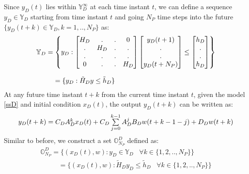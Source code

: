 \documentclass[letterpaper, 10 pt, conference]{ieeeconf}  %
\begin{document}
 Since $y_D(t)$ lies within $\mathbb{Y}_D^{\infty}$ at each time instant $t$, we can define a sequence $y_D \in \mathbb{Y}_D$ starting from time instant $t$ and going $N_P$ time steps into the future $\{y_D(t+k)\in\mathbb{Y}_D,k=1,..,N_P\}$ as:
 \begin{equation}
 \small
 \begin{matrix}
 \mathbb{Y}_D=\begin{Bmatrix}y_D:
 \begin{bmatrix}
 H_D & . & . & 0 \\
 . & H_D & . & .\\
 . & . & . & . \\
 0 & . & . & H_D
 \end{bmatrix}
 \begin{bmatrix}
 y_D(t+1) \\ . \\ . \\ y_D(t+N_P)
 \end{bmatrix}
 \leq \begin{bmatrix}
 h_D \\ . \\ . \\  h_D
 \end{bmatrix}
 \end{Bmatrix} 
 \\ \\
 \hspace{-120pt}
 = 
 \{ y_D: \tilde{H}_D y \leq \tilde{h}_D \}
 \end{matrix}
 \label{YD_set}
 \end{equation} 
At any future time instant $t+k$ from the current time instant $t$, given the model \eqref{ssD} and initial condition $x_D(t)$, the output $y_D(t+k)$ can be written as:
\begin{equation}
\small
\begin{matrix}
y_D(t+k)=C_DA_D^{k}x_D(t)+ C_D\sum\limits_{j=0}^{k-1}A_D^jB_Dw(t+k-1-j)+D_Dw(t+k) \\
\end{matrix}
\label{expanded_xD}
\end{equation}
Similar to before, we construct a set $\mathbb{O}^D_{N_P}$ defined as:
  \begin{equation}
  \begin{matrix}
  \mathbb{O}^D_{N_P} = \{(x_D(t),w):y_D\in \mathbb{Y}_D \hspace{10pt} \forall k \in \{1,2,..,N_P\} \}  \\
    \hspace{32pt} = \{(x_D(t),w):\tilde{H}_Dy_D \leq \tilde{h}_D \hspace{10pt} \forall k \in \{1,2,..,N_P\} \} 
  \end{matrix}
  \label{O_D_form}
  \end{equation}
\end{document}
